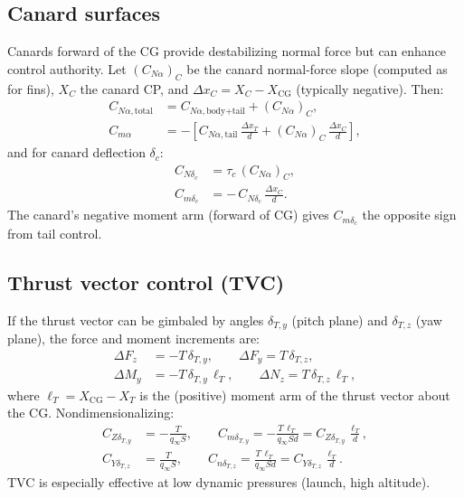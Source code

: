\documentclass[11pt]{article}
\begin{document}
\subsection{Canard surfaces}
Canards forward of the CG provide destabilizing normal force but can enhance control authority. Let $(C_{N\alpha})_C$ be the canard normal-force slope (computed as for fins), $X_C$ the canard CP, and $\Delta x_C = X_C - X_{\text{CG}}$ (typically negative). Then:
\begin{align}
C_{N\alpha,\text{total}} &= C_{N\alpha,\text{body+tail}} + (C_{N\alpha})_C,\\
C_{m\alpha} &= -\left[C_{N\alpha,\text{tail}}\,\frac{\Delta x_T}{d} + (C_{N\alpha})_C\,\frac{\Delta x_C}{d}\right],
\end{align}
and for canard deflection $\delta_c$:
\begin{align}
C_{N\delta_c} &= \tau_c\,(C_{N\alpha})_C,\\
C_{m\delta_c} &= -\,C_{N\delta_c}\,\frac{\Delta x_C}{d}.
\end{align}
The canard's negative moment arm (forward of CG) gives $C_{m\delta_c}$ the opposite sign from tail control.

\subsection{Thrust vector control (TVC)}
If the thrust vector can be gimbaled by angles $\delta_{T,y}$ (pitch plane) and $\delta_{T,z}$ (yaw plane), the force and moment increments are:
\begin{align}
\Delta F_z &= -T\,\delta_{T,y},\qquad \Delta F_y = T\,\delta_{T,z},\\
\Delta M_y &= -T\,\delta_{T,y}\,\ell_T,\qquad \Delta N_z = T\,\delta_{T,z}\,\ell_T,
\end{align}
where $\ell_T = X_{\text{CG}}-X_T$ is the (positive) moment arm of the thrust vector about the CG. Nondimensionalizing:
\begin{align}
C_{Z\delta_{T,y}} &= -\frac{T}{q_\infty S},\qquad
C_{m\delta_{T,y}} = -\frac{T\,\ell_T}{q_\infty S d} = C_{Z\delta_{T,y}}\,\frac{\ell_T}{d},\\
C_{Y\delta_{T,z}} &= \frac{T}{q_\infty S},\qquad
C_{n\delta_{T,z}} = \frac{T\,\ell_T}{q_\infty S d} = C_{Y\delta_{T,z}}\,\frac{\ell_T}{d}.
\end{align}
TVC is especially effective at low dynamic pressures (launch, high altitude).
\end{document}
